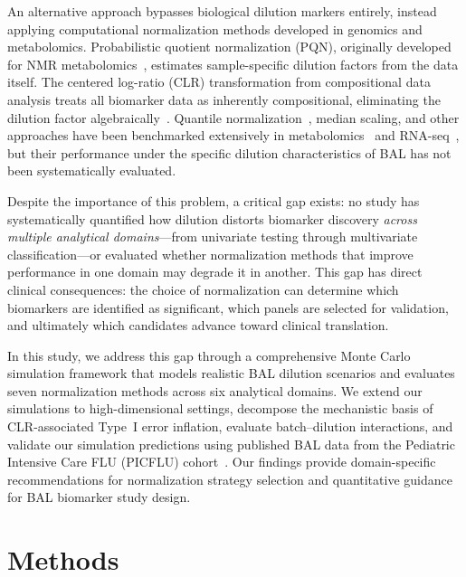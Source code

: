 \documentclass[12pt]{article}
\begin{document}
An alternative approach bypasses biological dilution markers entirely, instead applying computational normalization methods developed in genomics and metabolomics. Probabilistic quotient normalization (PQN), originally developed for NMR metabolomics~\cite{Dieterle2006}, estimates sample-specific dilution factors from the data itself. The centered log-ratio (CLR) transformation from compositional data analysis treats all biomarker data as inherently compositional, eliminating the dilution factor algebraically~\cite{Aitchison1986,Gloor2017,Fernandes2014}. Quantile normalization~\cite{Bolstad2003}, median scaling, and other approaches have been benchmarked extensively in metabolomics~\cite{Lu2025,Wang2018,Li2017,Valikangas2018,Chawade2014,VanDenBerg2006} and RNA-seq~\cite{Risso2014}, but their performance under the specific dilution characteristics of BAL has not been systematically evaluated.

Despite the importance of this problem, a critical gap exists: no study has systematically quantified how dilution distorts biomarker discovery \emph{across multiple analytical domains}---from univariate testing through multivariate classification---or evaluated whether normalization methods that improve performance in one domain may degrade it in another. This gap has direct clinical consequences: the choice of normalization can determine which biomarkers are identified as significant, which panels are selected for validation, and ultimately which candidates advance toward clinical translation.

In this study, we address this gap through a comprehensive Monte Carlo simulation framework that models realistic BAL dilution scenarios and evaluates seven normalization methods across six analytical domains. We extend our simulations to high-dimensional settings, decompose the mechanistic basis of CLR-associated Type~I error inflation, evaluate batch--dilution interactions, and validate our simulation predictions using published BAL data from the Pediatric Intensive Care FLU (PICFLU) cohort~\cite{Boyd2020,Randolph2011,Hall2013}. Our findings provide domain-specific recommendations for normalization strategy selection and quantitative guidance for BAL biomarker study design.

\section{Methods}
\end{document}
